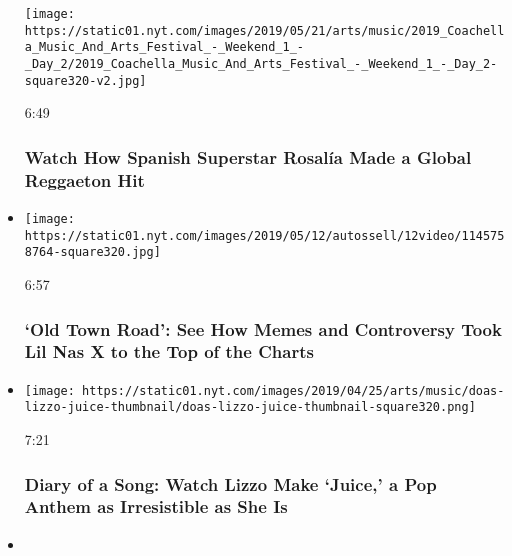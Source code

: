\begin{itemize}
  \texttt{[image: https://static01.nyt.com/images/2019/05/21/arts/music/2019\_Coachella\_Music\_And\_Arts\_Festival\_-\_Weekend\_1\_-\_Day\_2/2019\_Coachella\_Music\_And\_Arts\_Festival\_-\_Weekend\_1\_-\_Day\_2-square320-v2.jpg]}

  6:49

  \hypertarget{watch-how-spanish-superstar-rosaluxeda-made-a-global-reggaeton-hit}{%
  \subsubsection{Watch How Spanish Superstar Rosalía Made a Global
  Reggaeton
  Hit}\label{watch-how-spanish-superstar-rosaluxeda-made-a-global-reggaeton-hit}}
\item
  \href{https://www.nytimes.com/video/arts/music/100000006445156/old-town-road-lil-nas-x-billy-ray-cyrus.html?action=click\&module=video-series-bar\&region=header\&pgtype=Article\&playlistId=video/diaryofasong}{}

  \texttt{[image: https://static01.nyt.com/images/2019/05/12/autossell/12video/1145758764-square320.jpg]}

  6:57

  \hypertarget{old-town-road-see-how-memes-and-controversy-took-lil-nas-x-to-the-top-of-the-charts}{%
  \subsubsection{`Old Town Road': See How Memes and Controversy Took Lil
  Nas X to the Top of the
  Charts}\label{old-town-road-see-how-memes-and-controversy-took-lil-nas-x-to-the-top-of-the-charts}}
\item
  \href{https://www.nytimes.com/video/arts/music/100000006417770/lizzo-juice.html?action=click\&module=video-series-bar\&region=header\&pgtype=Article\&playlistId=video/diaryofasong}{}

  \texttt{[image: https://static01.nyt.com/images/2019/04/25/arts/music/doas-lizzo-juice-thumbnail/doas-lizzo-juice-thumbnail-square320.png]}

  7:21

  \hypertarget{diary-of-a-song-watch-lizzo-make-juice-a-pop-anthem-as-irresistible-as-she-is}{%
  \subsubsection{Diary of a Song: Watch Lizzo Make `Juice,' a Pop Anthem
  as Irresistible as She
  Is}\label{diary-of-a-song-watch-lizzo-make-juice-a-pop-anthem-as-irresistible-as-she-is}}
\item
  \href{https://www.nytimes.com/video/arts/music/100000006389803/billie-eilish-bury-a-friend.html?action=click\&module=video-series-bar\&region=header\&pgtype=Article\&playlistId=video/diaryofasong}{}


\end{itemize}
